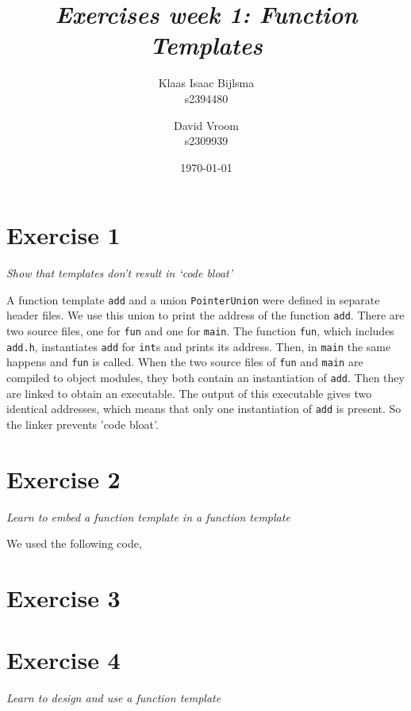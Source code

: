 \documentclass[12pt]{article}
\title{\itshape Exercises week 1: Function Templates}
\author{
	Klaas Isaac Bijlsma \\ s2394480
	\and
	David Vroom \\ s2309939
}
\date{\today}
\newcommand{\desc}[1]{\textit{#1} \vspace{1em}}
\begin{document}
\maketitle

\section*{Exercise 1}
\desc{Show that templates don't result in `code bloat'}

A function template \texttt{add} and a union \texttt{PointerUnion} were defined in separate header files. We use this union to print the address of the function \texttt{add}. There are two source files, one for \texttt{fun} and one for \texttt{main}. The function \texttt{fun}, which includes \texttt{add.h}, instantiates \texttt{add} for \texttt{int}s and prints its address. Then, in \texttt{main} the same happens and \texttt{fun} is called. When the two source files of \texttt{fun} and \texttt{main} are compiled to object modules, they both contain an instantiation of \texttt{add}. Then they are linked to obtain an executable. The output of this executable gives two identical addresses, which means that only one instantiation of \texttt{add} is present. So the linker prevents 'code bloat'.







\clearpage

\section*{Exercise 2}
\desc{Learn to embed a function template in a function template}

We used the following code,






\clearpage

\section*{Exercise 3}
\desc{}


\clearpage

\section*{Exercise 4}
\desc{Learn to design and use a function template}
\end{document}
